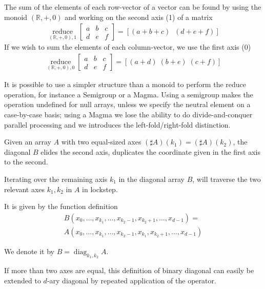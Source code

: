 \documentclass{DIKU-report-variant}
\newcommand\mrm[1]{\mathrm{#1}}
\newcommand\brm[1]{\bm{\mrm{#1}}}
\newcommand\Real{\mathbb{R}}
\newcommand\reduce{\operatorname*{\brm{reduce}}}
\newcommand\diag{\operatorname*{\brm{diag}}}
\begin{document}
\begin{example}
  \label{ex:reduce}
  The sum of the elements of each row-vector of a vector can be found by using the monoid \((\Real, +, 0)\)
  and working on the second axis (1) of a matrix
  \begin{align*}
    \reduce_{(\Real, +, 0), 1} \begin{bmatrix}
      a & b & c \\
      d & e & f
    \end{bmatrix} = [(a + b + c)\;\;(d + e + f)]
  \end{align*}
  If we wish to sum the elements of each column-vector, we use the first axis (0)
  \begin{align*}
    \reduce_{(\Real, +, 0), 0} \begin{bmatrix}
      a & b & c \\
      d & e & f
    \end{bmatrix} = [(a + d)\;(b + e)\;(c + f)]
  \end{align*}
\end{example}

\begin{remark}
  \label{rem:reduce}
  It is possible to use a simpler structure than a monoid to perform
  the reduce operation, for instance a Semigroup or a Magma. Using a semigroup
  makes the operation undefined for null arrays, unless we specify the neutral element
  on a case-by-case basis; using a Magma we lose the ability to do divide-and-conquer
  parallel processing and we introduces the left-fold/right-fold distinction.
\end{remark}

\begin{definition}
  \label{def:diagonal}
  Given an array \(A\) with two equal-sized axes \((\sharp A)(k_1) = (\sharp A)(k_2)\),
  the diagonal \(B\) elides the second axis, duplicates the coordinate given in the first
  axis to the second.

  Iterating over the remaining axis \(k_1\) in the diagonal array \(B\), will traverse the two relevant
  axes \(k_1,k_2\) in \(A\) in lockstep.

  It is given by the function definition
  \begin{align*}
    B(x_0, \dots, x_{k_1}, \dots, x_{k_2 - 1}, x_{k_2 + 1}, \dots, x_{d-1}) = \\
    A(x_0, \dots, x_{k_1}, \dots, x_{k_2 - 1}, x_{k_1}, x_{k_2 + 1}, \dots, x_{d-1})
  \end{align*}

  We denote it by \(B = \diag_{k_1,k_2} A\).

  If more than two axes are equal, this definition of binary diagonal can easily be extended to
  \(d\)-ary diagonal by repeated application of the operator.
\end{definition}
\end{document}
